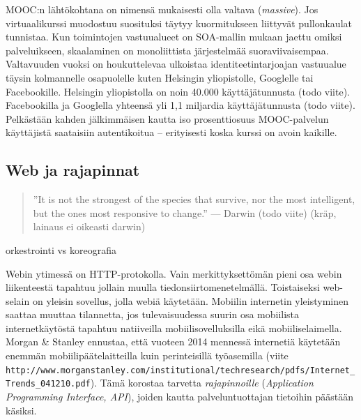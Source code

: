 \documentclass[finnish,gradu]{tktltiki}
\begin{document}
  MOOC:n lähtökohtana on nimensä mukaisesti olla valtava (\emph{massive}). Jos virtuaalikurssi muodostuu suosituksi täytyy kuormitukseen liittyvät pullonkaulat tunnistaa. Kun toimintojen vastuualueet on SOA-mallin mukaan jaettu omiksi palveluikseen, skaalaminen on monoliittista järjestelmää suoraviivaisempaa. Valtavuuden vuoksi on houkuttelevaa ulkoistaa identiteetintarjoajan vastuualue täysin kolmannelle osapuolelle kuten Helsingin yliopistolle, Googlelle tai Facebookille. Helsingin yliopistolla on noin 40.000 käyttäjätunnusta (todo viite). Facebookilla ja Googlella yhteensä yli 1,1 miljardia käyttäjätunnusta (todo viite). Pelkästään kahden jälkimmäisen kautta iso prosenttiosuus MOOC-palvelun käyttäjistä saataisiin autentikoitua -- erityisesti koska kurssi on avoin kaikille.



  \subsection{Web ja rajapinnat} %
  \label{sub:web_ja_rajapinnat}

  \begin{quote}
    ''It is not the strongest of the species that survive, nor the most intelligent, but the ones most responsive to change.'' --- Darwin (todo viite) (kräp, lainaus ei oikeasti darwin)
  \end{quote}

  orkestrointi vs koreografia

  Webin ytimessä on HTTP-protokolla. Vain merkittyksettömän pieni osa webin liikenteestä tapahtuu jollain muulla tiedonsiirtomenetelmällä. Toistaiseksi web-selain on yleisin sovellus, jolla webiä käytetään. Mobiilin internetin yleistyminen saattaa muuttaa tilannetta, jos tulevaisuudessa suurin osa mobiilista internetkäytöstä tapahtuu natiiveilla mobiilisovelluksilla eikä mobiiliselaimella. Morgan \& Stanley ennustaa, että vuoteen 2014 mennessä internetiä käytetään enemmän mobiilipäätelaitteilla kuin perinteisillä työasemilla (viite \verb!http://www.morganstanley.com/institutional/techresearch/pdfs/Internet_Trends_041210.pdf!). Tämä korostaa tarvetta \emph{rajapinnoille} (\emph{Application Programming Interface, API}), joiden kautta palveluntuottajan tietoihin päästään käsiksi.
\end{document}
